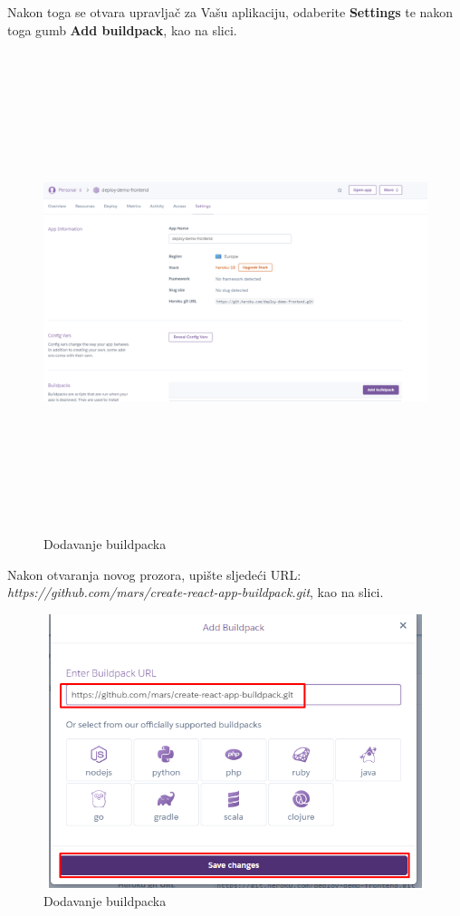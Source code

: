 			Nakon toga se otvara upravljač za Vašu aplikaciju, odaberite \textbf{Settings} te nakon toga gumb \textbf{Add buildpack}, kao na slici.
			
			\begin{figure}[H]
				\includegraphics[width=160mm, height=140mm]{slike/heroku-settings.png} %
				\centering
				\caption{Dodavanje buildpacka}
				\label{fig:dijagramdeployment}
			\end{figure}
			\eject 
			Nakon otvaranja novog prozora, upište sljedeći URL: \textit{https://github.com/mars/create-react-app-buildpack.git}, kao na slici.
			\begin{figure}[H]
				\includegraphics[width=130mm, height=80mm]{slike/heroku-buildp.png} %
				\centering
				\caption{Dodavanje buildpacka}
				\label{fig:dijagramdeployment}
			\end{figure}
			
